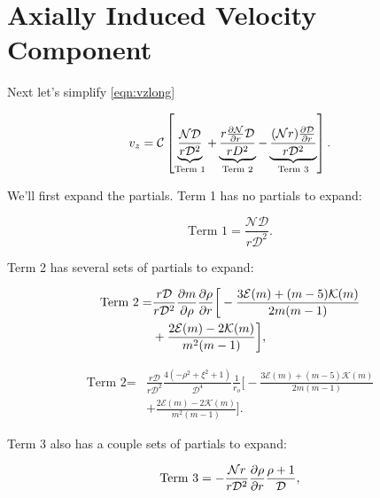 \section{Axially Induced Velocity Component}

Next let's simplify \cref{eqn:vzlong}

\begin{equation}
v_z = \mathcal{C}\left[\underbrace{\frac{\mathcal{N}\mathcal{D}}{r\mathcal{D}^2}}_\text{Term 1} + \underbrace{\frac{r\pd{\mathcal{N}}{r}\mathcal{D}}{rD^2}}_\text{Term 2} - \underbrace{\frac{(\mathcal{N}r)\pd{\mathcal{D}}{r}}{r\mathcal{D}^2}}_\text{Term 3}\right].
\end{equation}

\noindent We'll first expand the partials.
%
Term 1 has no partials to expand:

\begin{equation}
    \text{Term 1} = \frac{\mathcal{N}\mathcal{D}}{r\mathcal{D}^2}.
\end{equation}

\noindent Term 2 has several sets of partials to expand:

\begin{equation}
    \begin{split}
    \text{Term 2} =& \frac{r\mathcal{D}}{r\mathcal{D}^2} \frac{\partial m}{\partial \rho}\frac{\partial \rho}{\partial r} \bigg[ -\frac{3\mathcal{E}(m) + (m-5)\mathcal{K}(m)}{2m(m-1)} \\
         &+ \frac{2\mathcal{E}(m) - 2\mathcal{K}(m)}{m^2(m-1)} \bigg],
    \end{split}
\end{equation}

\begin{equation}
    \begin{split}
        \text{Term 2} =& \frac{r\mathcal{D}}{r\mathcal{D}^2} \frac{4(-\rho^2+\xi^2 +1)}{\mathcal{D}^4}\frac{1}{r_o} \bigg[ -\frac{3\mathcal{E}(m) + (m-5)\mathcal{K}(m)}{2m(m-1)} \\
         &+ \frac{2\mathcal{E}(m) - 2\mathcal{K}(m)}{m^2(m-1)} \bigg].
    \end{split}
\end{equation}

\noindent Term 3 also has a couple sets of partials to expand:

\begin{equation}
        \text{Term 3} = -\frac{\mathcal{N}r}{r\mathcal{D}^2}\frac{\partial \rho}{\partial r}\frac{\rho+1}{\mathcal{D}},
\end{equation}

